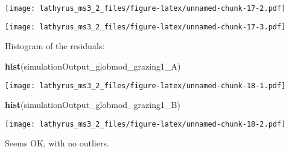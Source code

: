 \documentclass[
]{article}
\newenvironment{Shaded}{\begin{snugshade}}{\end{snugshade}}
\newcommand{\KeywordTok}[1]{\textcolor[rgb]{0.13,0.29,0.53}{\textbf{#1}}}
\newcommand{\NormalTok}[1]{#1}
\newcommand{\OperatorTok}[1]{\textcolor[rgb]{0.81,0.36,0.00}{\textbf{#1}}}
\begin{document}
\begin{Shaded}
\end{Shaded}

\texttt{[image: lathyrus\_ms3\_2\_files/figure-latex/unnamed-chunk-17-2.pdf]}

\begin{Shaded}
\end{Shaded}

\texttt{[image: lathyrus\_ms3\_2\_files/figure-latex/unnamed-chunk-17-3.pdf]}

Histogram of the residuals:

\begin{Shaded}
\begin{Highlighting}[]
\KeywordTok{hist}\NormalTok{(simulationOutput_globmod_grazing1_A)}
\end{Highlighting}
\end{Shaded}

\texttt{[image: lathyrus\_ms3\_2\_files/figure-latex/unnamed-chunk-18-1.pdf]}

\begin{Shaded}
\begin{Highlighting}[]
\KeywordTok{hist}\NormalTok{(simulationOutput_globmod_grazing1_B)}
\end{Highlighting}
\end{Shaded}

\texttt{[image: lathyrus\_ms3\_2\_files/figure-latex/unnamed-chunk-18-2.pdf]}

Seems OK, with no outliers.
\end{document}
